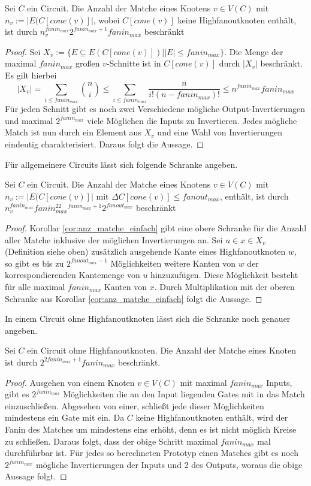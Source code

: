 \documentclass[11pt, a4paper, german]{article}
\begin{document}
\begin{cor}\label{cor:anz_matche_einfach}
Sei $C$ ein Circuit. Die Anzahl der Matche eines Knotens $v\in V(C)$ mit $n_v := |E(C[cone(v)]|$, wobei $C[cone(v)]$ keine Highfanoutknoten enthält, ist durch $n_v^{fanin_{max}} 2^{fanin_{max}+1} fanin_{max}$ beschränkt
\end{cor}
\begin{proof}
Sei  $X_v:= \{ E \subseteq E(C[cone(v)]) | |E|\leq fanin_{max}  \}$. Die Menge der maximal $fanin_{max}$ großen $v$-Schnitte ist in $C[cone(v)]$ durch $ |X_v|$ beschränkt. Es gilt hierbei \[ |X_v| = \sum\limits_{i \leq fanin_{max}} \binom{n}{i} \leq  \sum\limits_{i \leq fanin_{max}}\frac{n}{i!(n-fanin_{max})!} \leq n^{fanin_{max}} fanin_{max} \]
Für jeden Schnitt gibt es noch zwei Verschiedene mögliche Output-Invertierungen und maximal  $2^{fanin_{max}}$ viele Möglichen die Inputs zu Invertieren. Jedes mögliche Match ist nun durch ein Element aus $X_v$ und eine Wahl von Invertierungen eindeutig charakterisiert. Daraus folgt die Aussage.
\end{proof}
Für allgemeinere Circuits lässt sich folgende Schranke angeben. 
\begin{cor}\label{cor:anzahl_matche_bel}
Sei $C$ ein Circuit. Die Anzahl der Matche eines Knotens $v\in V(C)$ mit $n_v := |E(C[cone(v)]|$ mit $\Delta C[cone(v)] \leq fanout_{max}$, enthält, ist durch $n_v^{fanin_{max}} fanin_{max}^22^{fanin_{max}+1}2^{fanout_{max}}$ beschränkt
\end{cor}
\begin{proof}
Korollar \ref{cor:anz_matche_einfach} gibt eine obere Schranke für die Anzahl aller Matche inklusive der möglichen Invertierungen an. Sei $u \in x \in X_v$ (Definition siehe oben) zusätzlich ausgehende Kante eines Highfanoutknoten $w$, so gibt es bis zu $2^{fanout_{max}-1}$ Möglichkeiten weitere Kanten von $w$ der korrespondierenden Kantemenge von $u$ hinzuzufügen.  Diese Möglichkeit besteht für alle maximal $fanin_{max}$ Kanten von $x$. Durch Multiplikation mit der oberen Schranke aus Korollar \ref{cor:anz_matche_einfach} folgt die Aussage.
\end{proof}
In einem Circuit ohne Highfanoutknoten lässt sich die Schranke noch genauer angeben. 
\begin{cor}\label{cor:anz_matche_einfach_genauer}
Sei $C$ ein Circuit ohne Highfanoutknoten. Die Anzahl der Matche eines Knoten ist durch $2^{2fanin_{max} +1}fanin_{max}$ beschränkt.
\end{cor}
\begin{proof}
Ausgehen von einem Knoten $v \in V(C)$ mit maximal $fanin_{max}$ Inputs, gibt es  $2^{fanin_{max}}$ Möglichkeiten die an den Input liegenden Gates mit in das Match einzuschließen. Abgesehen von einer, schließt jede dieser Möglichkeiten mindestens ein Gate mit ein. Da $C$ keine Highfanoutknoten enthält, wird der Fanin des Matches um mindestens eins erhöht, denn es ist nicht möglich Kreise zu schließen. Daraus folgt, dass der obige Schritt maximal $fanin_{max}$ mal durchführbar ist. Für jedes so berechneten Prototyp einen Matches gibt es noch $2^{fanin_{max}}$ mögliche Invertierungen der Inputs und $2$ des Outputs, woraus die obige Aussage folgt.
\end{proof}
\end{document}
